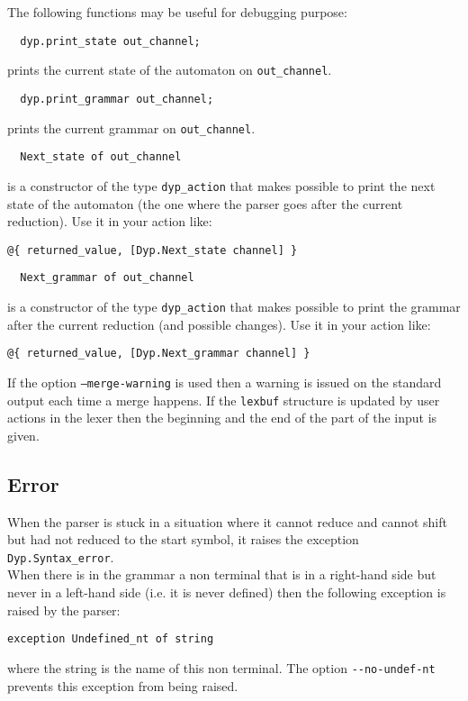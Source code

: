 \documentclass[12pt]{article}
\begin{document}
{The following functions may be useful for debugging purpose:
\begin{verbatim}
  dyp.print_state out_channel;
\end{verbatim}
prints the current state of the automaton on \verb|out_channel|.

\begin{verbatim}
  dyp.print_grammar out_channel;
\end{verbatim}
prints the current grammar on \verb|out_channel|.

\begin{verbatim}
  Next_state of out_channel
\end{verbatim}
is a constructor of the type \verb|dyp_action| that makes possible to print the next state of the automaton (the one where the parser goes after the current reduction). Use it in your action like:
\begin{verbatim}
@{ returned_value, [Dyp.Next_state channel] }
\end{verbatim}

\begin{verbatim}
  Next_grammar of out_channel
\end{verbatim}
is a constructor of the type \verb|dyp_action| that makes possible to print the grammar after the current reduction (and possible changes). Use it in your action like:
\begin{verbatim}
@{ returned_value, [Dyp.Next_grammar channel] }
\end{verbatim}

If the option \texttt{--merge-warning} is used then a warning is issued on the standard output each time a merge happens. If the \texttt{lexbuf} structure is updated by user actions in the lexer then the beginning and the end of the part of the input is given.

\subsection{Error}

When the parser is stuck in a situation where it cannot reduce and cannot shift but had not reduced to the start symbol, it raises the exception \verb|Dyp.Syntax_error|.\\

When there is in the grammar a non terminal that is in a right-hand side but never in a left-hand side (i.e. it is never defined) then the following exception is raised by the parser:
\begin{verbatim}
exception Undefined_nt of string
\end{verbatim}
where the string is the name of this non terminal. The option \verb|--no-undef-nt| prevents this exception from being raised.

}
\end{document}
